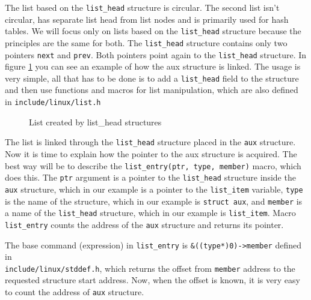 The list based on the \texttt{list\_head} structure is circular. The second list isn't circular,
has separate list head from list nodes and is primarily used for hash tables. 
We will focus only on lists based on the \texttt{list\_head} structure because the
principles are the same for both. The \texttt{list\_head} structure contains only two
pointers \texttt{next} and \texttt{prev}. Both pointers point again to the
\texttt{list\_head} structure. In figure \ref{fig:vfs_list} you can see an example of how
the aux structure is linked. The usage is very simple, all that has to be done is to
add a \texttt{list\_head} field to the structure and then use functions and macros for
list manipulation, which are also defined in \texttt{include/linux/list.h}

\begin{figure}[h]
	\begin{center}
		
	\end{center}
	\caption{List created by list\_head structures}
	\label{fig:vfs_list}
\end{figure}

The list is linked through the \texttt{list\_head} structure placed in the \texttt{aux}
structure. Now it is time to explain how the pointer to the aux structure is acquired.
The best way will be to describe the \texttt{list\_entry(ptr, type, member)} macro, which
does this. The \texttt{ptr} argument is a pointer to the \texttt{list\_head}
structure inside the \texttt{aux} structure, which in our example is a pointer to the
\texttt{list\_item} variable, \texttt{type} is the name of the structure, which in our example
is \texttt{struct aux}, and \texttt{member} is a name of the \texttt{list\_head}
structure, which in our example is \texttt{list\_item}. Macro \texttt{list\_entry}
counts the address of the \texttt{aux} structure and returns its pointer. 

The base command (expression) in \texttt{list\_entry} is \texttt{\&((type*)0)->member}
defined in \\ \texttt{include/linux/stddef.h}, which returns the offset from
\texttt{member} address to the requested structure start address. Now, when the offset
is known, it is very easy to count the address of \texttt{aux} structure.

 
